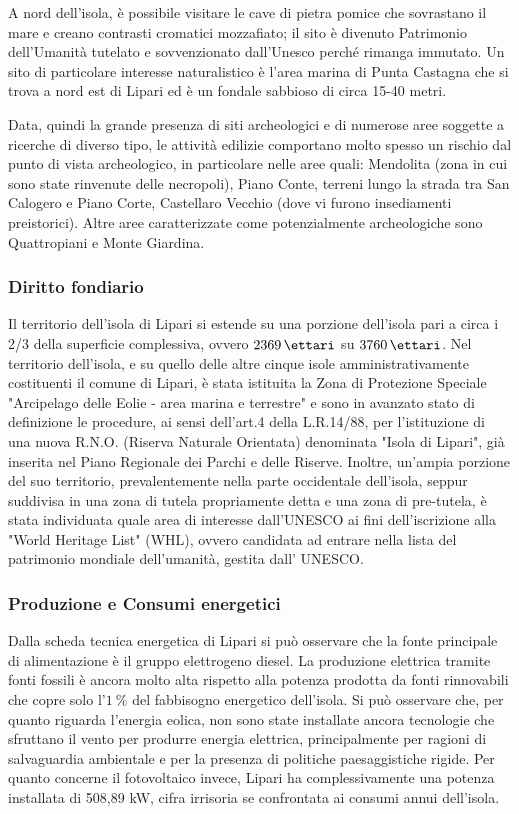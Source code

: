 \documentclass[fleqn,11pt]{SelfArx} %
\begin{document}
A nord dell'isola, è possibile visitare le cave di pietra pomice che sovrastano il mare e creano contrasti cromatici mozzafiato; il sito è divenuto Patrimonio dell'Umanità tutelato e sovvenzionato dall'Unesco perché rimanga immutato.
Un sito di particolare interesse naturalistico è l'area marina di Punta Castagna che  si trova a nord est di Lipari ed è un fondale sabbioso di circa 15-40 metri. 

Data, quindi la grande presenza di siti archeologici e di numerose aree soggette a ricerche di diverso tipo, le attività edilizie comportano molto spesso un rischio dal punto di vista archeologico, in particolare nelle aree quali: Mendolita (zona in cui sono state rinvenute delle necropoli), Piano Conte, terreni lungo la strada tra San Calogero e Piano Corte, Castellaro Vecchio (dove vi furono insediamenti preistorici). Altre aree caratterizzate come potenzialmente archeologiche sono Quattropiani e Monte Giardina.


\subsubsection{Diritto fondiario}
Il territorio dell'isola di Lipari si estende su una porzione dell'isola pari a circa i 2/3 della superficie complessiva, ovvero \(\SI{2369}{\ettari}\) su \(\SI{3760}{\ettari}\). Nel territorio dell'isola, e su quello delle altre cinque isole amministrativamente costituenti il comune di Lipari, è stata istituita la Zona di Protezione Speciale "Arcipelago delle Eolie - area marina e terrestre" e sono in avanzato stato di definizione le procedure, ai sensi dell'art.4 della L.R.14/88, per l'istituzione di una nuova R.N.O. (Riserva Naturale Orientata) denominata "Isola di Lipari", già inserita nel Piano Regionale dei Parchi e delle Riserve. Inoltre, un'ampia porzione del suo territorio, prevalentemente nella parte occidentale dell'isola, seppur suddivisa in una zona di tutela propriamente detta e una zona di pre-tutela, è stata individuata quale area di interesse dall'UNESCO ai fini dell'iscrizione alla "World Heritage List" (WHL), ovvero candidata ad entrare nella lista del patrimonio mondiale dell'umanità, gestita dall' UNESCO. 

\subsubsection{Produzione e Consumi energetici}
Dalla scheda tecnica energetica di Lipari si può osservare che la fonte principale di alimentazione è il gruppo elettrogeno diesel. La produzione elettrica tramite fonti fossili è ancora molto alta rispetto alla potenza prodotta da fonti rinnovabili che copre solo l'\(\SI{1}{\percent}\) del fabbisogno energetico dell'isola. Si può osservare che, per quanto riguarda l'energia eolica, non sono state installate ancora tecnologie che sfruttano il vento per produrre energia elettrica, principalmente per ragioni di salvaguardia ambientale e per la presenza di politiche paesaggistiche rigide. Per quanto concerne il fotovoltaico invece, Lipari ha complessivamente una potenza installata di 508,89 kW, cifra irrisoria se confrontata ai consumi annui dell'isola.
\end{document}
